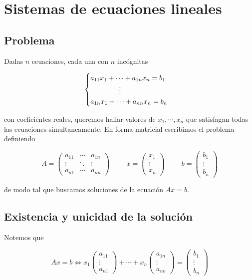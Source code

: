 \section{Sistemas de ecuaciones lineales}

\subsection{Problema}

Dadas $n$ ecuaciones, cada una con $n$ incógnitas

\[\begin{cases}
a_{11} x_1 + \cdots + a_{1n} x_n = b_1 \\
\hspace{1.45cm}\vdots \\ 
a_{1n} x_1 + \cdots + a_{nn} x_n = b_n 
\end{cases}\]

con coeficientes reales, queremos hallar valores de $x_1, \cdots, x_n$ que satisfagan todas las ecuaciones simultaneamente. En forma matricial escribimos el problema definiendo

\[A = \begin{pmatrix}
a_{11} & \cdots & a_{1n}\\
\vdots & \ddots & \vdots\\
a_{n1} & \cdots & a_{nn}
\end{pmatrix}
\hspace{1cm}
x = \begin{pmatrix}
x_1 \\
\vdots \\
x_n
\end{pmatrix}
\hspace{1cm}
b = \begin{pmatrix}
b_1 \\
\vdots \\
b_n
\end{pmatrix}\]

de modo tal que buscamos soluciones de la ecuación $Ax = b$.

\subsection{Existencia y unicidad de la solución}

Notemos que 

\[
Ax = b \Leftrightarrow x_1 \begin{pmatrix} a_{11}\\ \vdots\\ a_{n1}\end{pmatrix} + \cdots + x_n \begin{pmatrix} a_{1n}\\ \vdots\\ a_{nn}\end{pmatrix} = \begin{pmatrix} b_{1}\\ \vdots\\ b_{n}\end{pmatrix}
\]

